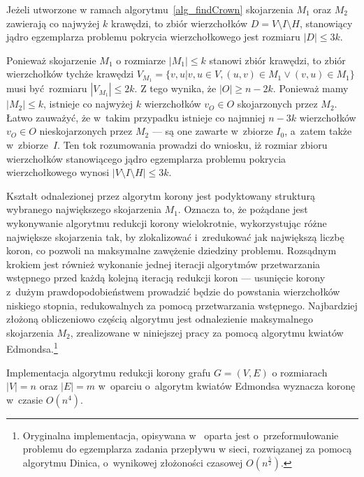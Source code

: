 \begin{theorem}
  Jeżeli utworzone w ramach algorytmu~\ref{alg_findCrown} skojarzenia $M_1$ oraz $M_2$ zawierają co najwyżej $k$ krawędzi, to zbiór wierzchołków $D=V \setminus I \setminus H$, stanowiący jądro egzemplarza problemu pokrycia wierzchołkowego jest rozmiaru $|D| \leq 3k$.
\end{theorem}
\begin{bproof}
  Ponieważ skojarzenie $M_1$ o rozmiarze $|M_1| \leq k$ stanowi zbiór krawędzi, to zbiór wierzchołków tychże krawędzi $V_{M_1}=\{v, u|v, u \in V, (u,v)\in M_1 \lor (v,u) \in M_1\}$ musi być rozmiaru $ |V_{M_1}| \leq 2k$.
  Z tego wynika, że $|O| \geq n-2k$.
  Ponieważ mamy $|M_2| \leq k$, istnieje co najwyżej $k$ wierzchołków $v_O \in O$ skojarzonych przez $M_2$.
  Łatwo zauważyć, że w~takim przypadku istnieje co najmniej $n-3k$ wierzchołków $v_O \in O$ nieskojarzonych przez $M_2$ --- są one zawarte w~zbiorze $I_0$, a~zatem także w~zbiorze~$I$.
  Ten tok rozumowania prowadzi do wniosku, iż rozmiar zbioru wierzchołków stanowiącego jądro egzemplarza problemu pokrycia wierzchołkowego wynosi $|V \setminus I \setminus H| \leq 3k$.
\end{bproof}
\par{
  Kształt odnalezionej przez algorytm korony jest podyktowany strukturą wybranego największego skojarzenia $M_1$.
  Oznacza to, że pożądane jest wykonywanie algorytmu redukcji korony wielokrotnie, wykorzystując różne największe skojarzenia tak, by zlokalizować i~zredukować jak największą liczbę koron, co pozwoli na maksymalne zawężenie dziedziny problemu.
  Rozsądnym krokiem jest również wykonanie jednej iteracji algorytmów przetwarzania wstępnego przed każdą kolejną iteracją redukcji koron --- usunięcie korony z~dużym prawdopodobieństwem prowadzić będzie do powstania wierzchołków niskiego stopnia, redukowalnych za pomocą przetwarzania wstępnego.
  Najbardziej złożoną obliczeniowo częścią algorytmu jest odnalezienie maksymalnego skojarzenia $M_2$, zrealizowane w niniejszej pracy za pomocą algorytmu kwiatów Edmondsa.\footnote{
    Oryginalna implementacja, opisywana
    w~\cite{KernelizationAlgorithms04} oparta jest o~przeformułowanie problemu do
    egzemplarza zadania przepływu w sieci, rozwiązanej za pomocą algorytmu Dinica,
    o~wynikowej złożoności czasowej $O(n^{\frac{5}{2}})$.
  }
}
\begin{theorem}
  Implementacja algorytmu redukcji korony grafu $G=(V,E)$ o rozmiarach $|V|=n$ oraz $|E|=m$ w~oparciu o~algorytm kwiatów Edmondsa wyznacza koronę w~czasie $O(n^{4})$.
\end{theorem}
